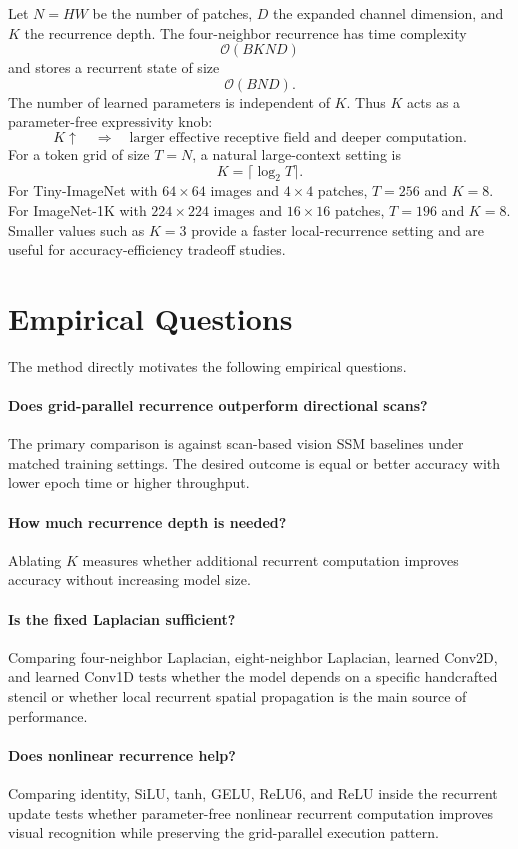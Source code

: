 \documentclass[11pt]{article}
\begin{document}
Let $N=H W$ be the number of patches, $D$ the expanded channel dimension, and $K$
the recurrence depth. The four-neighbor recurrence has time complexity
\[
    \mathcal{O}(B K N D)
\]
and stores a recurrent state of size
\[
    \mathcal{O}(B N D).
\]
The number of learned parameters is independent of $K$. Thus $K$ acts as a
parameter-free expressivity knob:
\[
    K \uparrow
    \quad\Rightarrow\quad
    \text{larger effective receptive field and deeper computation}.
\]
For a token grid of size $T=N$, a natural large-context setting is
\[
    K = \lceil \log_2 T \rceil.
\]
For Tiny-ImageNet with $64\times64$ images and $4\times4$ patches, $T=256$ and
$K=8$. For ImageNet-1K with $224\times224$ images and $16\times16$ patches,
$T=196$ and $K=8$. Smaller values such as $K=3$ provide a faster local-recurrence
setting and are useful for accuracy-efficiency tradeoff studies.

\section{Empirical Questions}

The method directly motivates the following empirical questions.

\paragraph{Does grid-parallel recurrence outperform directional scans?}
The primary comparison is against scan-based vision SSM baselines under matched
training settings. The desired outcome is equal or better accuracy with lower
epoch time or higher throughput.

\paragraph{How much recurrence depth is needed?}
Ablating $K$ measures whether additional recurrent computation improves accuracy
without increasing model size.

\paragraph{Is the fixed Laplacian sufficient?}
Comparing four-neighbor Laplacian, eight-neighbor Laplacian, learned Conv2D, and
learned Conv1D tests whether the model depends on a specific handcrafted stencil
or whether local recurrent spatial propagation is the main source of performance.

\paragraph{Does nonlinear recurrence help?}
Comparing identity, SiLU, tanh, GELU, ReLU6, and ReLU inside the recurrent update
tests whether parameter-free nonlinear recurrent computation improves visual
recognition while preserving the grid-parallel execution pattern.
\end{document}
